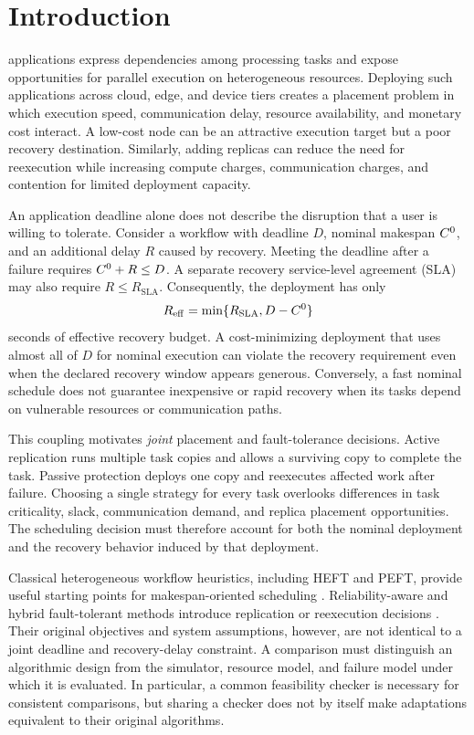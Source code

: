 \section{Introduction}
\label{sec:introduction}
 applications express dependencies among processing
tasks and expose opportunities for parallel execution on heterogeneous
resources. Deploying such applications across cloud, edge, and device tiers
creates a placement problem in which execution speed, communication delay,
resource availability, and monetary cost interact. A low-cost node can be an
attractive execution target but a poor recovery destination. Similarly, adding
replicas can reduce the need for reexecution while increasing compute charges,
communication charges, and contention for limited deployment capacity.

An application deadline alone does not describe the disruption that a user is
willing to tolerate. Consider a workflow with deadline $D$, nominal makespan
$C^{0}$, and an additional delay $R$ caused by recovery. Meeting the deadline
after a failure requires $C^{0}+R\leq D$. A separate recovery service-level
agreement (SLA) may also require $R\leq R_{\mathrm{SLA}}$. Consequently, the
deployment has only
\begin{equation}
  R_{\mathrm{eff}}=\min\{R_{\mathrm{SLA}},D-C^{0}\}
  \label{eq:intro_budget}
\end{equation}
seconds of effective recovery budget. A cost-minimizing deployment that uses
almost all of $D$ for nominal execution can violate the recovery requirement
even when the declared recovery window appears generous. Conversely, a fast
nominal schedule does not guarantee inexpensive or rapid recovery when its
tasks depend on vulnerable resources or communication paths.

This coupling motivates \emph{joint} placement and fault-tolerance decisions.
Active replication runs multiple task copies and allows a surviving copy to
complete the task. Passive protection deploys one copy and reexecutes affected
work after failure. Choosing a single strategy for every task overlooks
differences in task criticality, slack, communication demand, and replica
placement opportunities. The scheduling decision must therefore account for
both the nominal deployment and the recovery behavior induced by that
deployment.

Classical heterogeneous workflow heuristics, including HEFT and PEFT, provide
useful starting points for makespan-oriented scheduling
\cite{topcuoglu2002heft,arabnejad2014peft}. Reliability-aware and hybrid
fault-tolerant methods introduce replication or reexecution decisions
\cite{qin2023ramoma,taghinezhad2025recrd,ren2026hfwpf}. Their original objectives
and system assumptions, however, are not identical to a joint deadline and
recovery-delay constraint. A comparison must distinguish an algorithmic
design from the simulator, resource model, and failure model under which it is
evaluated. In particular, a common feasibility checker is necessary for
consistent comparisons, but sharing a checker does not by itself make
adaptations equivalent to their original algorithms.

